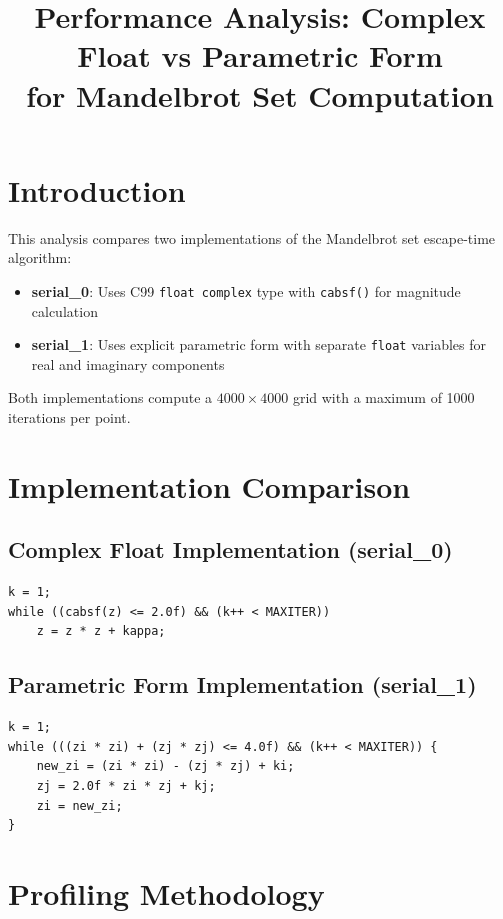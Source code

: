 \documentclass[11pt]{article}
\title{Performance Analysis: Complex Float vs Parametric Form\\for Mandelbrot Set Computation}
\author{}
\date{}
\begin{document}
\maketitle

\section{Introduction}

This analysis compares two implementations of the Mandelbrot set escape-time algorithm:
\begin{itemize}
    \item \textbf{serial\_0}: Uses C99 \texttt{float complex} type with \texttt{cabsf()} for magnitude calculation
    \item \textbf{serial\_1}: Uses explicit parametric form with separate \texttt{float} variables for real and imaginary components
\end{itemize}

Both implementations compute a $4000 \times 4000$ grid with a maximum of 1000 iterations per point.

\section{Implementation Comparison}

\subsection{Complex Float Implementation (serial\_0)}

\begin{lstlisting}[caption={Hot loop using complex float},firstnumber=28]
k = 1;
while ((cabsf(z) <= 2.0f) && (k++ < MAXITER)) 
    z = z * z + kappa;
\end{lstlisting}

\subsection{Parametric Form Implementation (serial\_1)}

\begin{lstlisting}[caption={Hot loop using parametric form},firstnumber=29]
k = 1;
while (((zi * zi) + (zj * zj) <= 4.0f) && (k++ < MAXITER)) { 
    new_zi = (zi * zi) - (zj * zj) + ki;
    zj = 2.0f * zi * zj + kj;
    zi = new_zi;
}
\end{lstlisting}

\section{Profiling Methodology}
\end{document}

